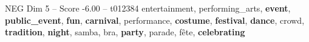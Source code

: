 \begin{textsample}{NEG Dim 5 – Score -6.00 – t012384}  \label{ex:f5_neg_023}
entertainment, performing\_arts, \textbf{event}, \textbf{public\_event}, \textbf{fun}, \textbf{carnival}, performance, \textbf{costume}, \textbf{festival}, \textbf{dance}, crowd, \textbf{tradition}, \textbf{night}, samba, bra, \textbf{party}, parade, fête, \textbf{celebrating}

\end{textsample}

